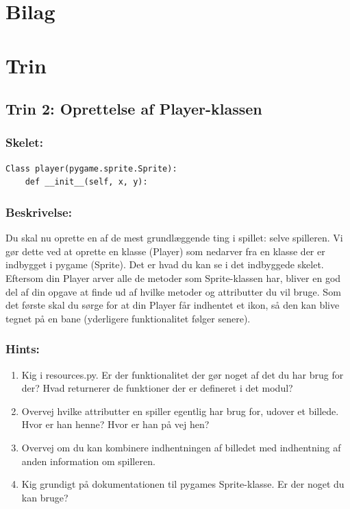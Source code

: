\documentclass[10pt,a4paper,danish]{article}
\begin{document}
\section{Bilag}
\section{Trin}
\subsection{Trin 2: Oprettelse af Player-klassen}
\subsubsection{Skelet:}
\begin{verbatim}
Class player(pygame.sprite.Sprite):
    def __init__(self, x, y):
\end{verbatim}
\subsubsection{Beskrivelse:}
Du skal nu oprette en af de mest grundlæggende ting i spillet: selve spilleren.
Vi gør dette ved at oprette en klasse (Player) som nedarver fra en klasse der
er indbygget i pygame (Sprite). Det er hvad du kan se i det indbyggede skelet. 
Eftersom din Player arver alle de metoder som Sprite-klassen har, bliver en 
god del af din opgave at finde ud af hvilke metoder og attributter du vil bruge.
Som det første skal du sørge for at din Player får indhentet et ikon, så den kan 
blive tegnet på en bane (yderligere funktionalitet følger senere). 
\\
\subsubsection{Hints:}
\begin{enumerate}
\item Kig i resources.py. Er der funktionalitet der gør noget af 
det du har brug for der? Hvad returnerer de funktioner der er defineret
i det modul?
\item Overvej hvilke attributter en spiller egentlig har brug for, udover
et billede. Hvor er han henne? Hvor er han på vej hen? 
\item Overvej om du kan kombinere indhentningen af billedet med indhentning
af anden information om spilleren.
\item Kig grundigt på dokumentationen til pygames Sprite-klasse. Er
der noget du kan bruge? 
\end{enumerate}
\end{document}
